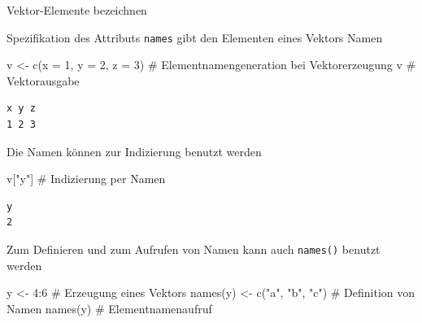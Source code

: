 \documentclass[
  8pt,
  ignorenonframetext,
]{beamer}
\newenvironment{Shaded}{\begin{snugshade}}{\end{snugshade}}
\newcommand{\AttributeTok}[1]{\textcolor[rgb]{0.40,0.45,0.13}{#1}}
\newcommand{\CommentTok}[1]{\textcolor[rgb]{0.37,0.37,0.37}{#1}}
\newcommand{\DecValTok}[1]{\textcolor[rgb]{0.68,0.00,0.00}{#1}}
\newcommand{\FunctionTok}[1]{\textcolor[rgb]{0.28,0.35,0.67}{#1}}
\newcommand{\NormalTok}[1]{\textcolor[rgb]{0.00,0.23,0.31}{#1}}
\newcommand{\OtherTok}[1]{\textcolor[rgb]{0.00,0.23,0.31}{#1}}
\newcommand{\SpecialCharTok}[1]{\textcolor[rgb]{0.37,0.37,0.37}{#1}}
\newcommand{\StringTok}[1]{\textcolor[rgb]{0.13,0.47,0.30}{#1}}
\begin{document}
\begin{frame}[fragile]{Vektor-Elemente bezeichnen}
\protect\hypertarget{vektor-elemente-bezeichnen}{}

\small

Spezifikation des Attributs \texttt{names} gibt den Elementen eines
Vektors Namen \vspace{0.5mm} \tiny

\begin{Shaded}
\begin{Highlighting}[]
\NormalTok{v }\OtherTok{\textless{}{-}} \FunctionTok{c}\NormalTok{(}\AttributeTok{x =} \DecValTok{1}\NormalTok{, }\AttributeTok{y =} \DecValTok{2}\NormalTok{, }\AttributeTok{z =} \DecValTok{3}\NormalTok{)  }\CommentTok{\# Elementnamengeneration bei Vektorerzeugung}
\NormalTok{v                            }\CommentTok{\# Vektorausgabe}
\end{Highlighting}
\end{Shaded}

\begin{verbatim}
x y z 
1 2 3 
\end{verbatim}

\vspace{1.5mm}
\small

Die Namen können zur Indizierung benutzt werden \vspace{0.5mm} \tiny

\begin{Shaded}
\begin{Highlighting}[]
\NormalTok{v[}\StringTok{"y"}\NormalTok{]                       }\CommentTok{\# Indizierung per Namen}
\end{Highlighting}
\end{Shaded}

\begin{verbatim}
y 
2 
\end{verbatim}

\vspace{1.5mm}
\small

Zum Definieren und zum Aufrufen von Namen kann auch \texttt{names()}
benutzt werden \vspace{0.5mm} \tiny

\begin{Shaded}
\begin{Highlighting}[]
\NormalTok{y }\OtherTok{\textless{}{-}} \DecValTok{4}\SpecialCharTok{:}\DecValTok{6}                     \CommentTok{\# Erzeugung eines Vektors}
\FunctionTok{names}\NormalTok{(y) }\OtherTok{\textless{}{-}} \FunctionTok{c}\NormalTok{(}\StringTok{"a"}\NormalTok{, }\StringTok{"b"}\NormalTok{, }\StringTok{"c"}\NormalTok{) }\CommentTok{\# Definition von Namen}
\FunctionTok{names}\NormalTok{(y)                     }\CommentTok{\# Elementnamenaufruf}
\end{Highlighting}
\end{Shaded}


\end{frame}
\end{document}
